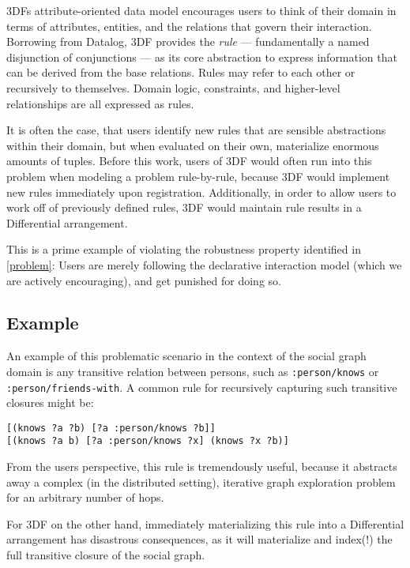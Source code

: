 \documentclass[../catalog.tex]{subfiles}
\begin{document}
3DFs attribute-oriented data model encourages users to think of their
domain in terms of attributes, entities, and the relations that govern
their interaction. Borrowing from Datalog, 3DF provides the
\emph{rule} — fundamentally a named disjunction of conjunctions — as
its core abstraction to express information that can be derived from
the base relations. Rules may refer to each other or recursively to
themselves. Domain logic, constraints, and higher-level relationships
are all expressed as rules.

It is often the case, that users identify new rules that are sensible
abstractions within their domain, but when evaluated on their own,
materialize enormous amounts of tuples. Before this work, users of 3DF
would often run into this problem when modeling a problem
rule-by-rule, because 3DF would implement new rules immediately upon
registration. Additionally, in order to allow users to work off of
previously defined rules, 3DF would maintain rule results in a
Differential arrangement.

This is a prime example of violating the robustness property
identified in \autoref{problem}: Users are merely following the
declarative interaction model (which we are actively encouraging), and
get punished for doing so.

\subsection{Example}

An example of this problematic scenario in the context of the social
graph domain is any transitive relation between persons, such as
\texttt{:person/knows} or \texttt{:person/friends-with}. A common rule
for recursively capturing such transitive closures might be:

\begin{verbatim}
[(knows ?a ?b) [?a :person/knows ?b]]
[(knows ?a b) [?a :person/knows ?x] (knows ?x ?b)]
\end{verbatim}

From the users perspective, this rule is tremendously useful, because
it abstracts away a complex (in the distributed setting), iterative
graph exploration problem for an arbitrary number of hops.

For 3DF on the other hand, immediately materializing this rule into a
Differential arrangement has disastrous consequences, as it will
materialize and index(!) the full transitive closure of the social
graph.
\end{document}
